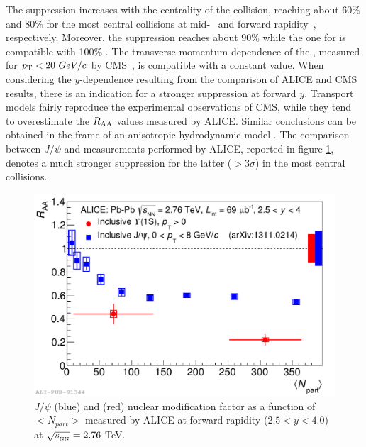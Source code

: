 The suppression increases with the centrality of the collision, reaching about 60\% and 80\% for the most central collisions at mid-~\cite{Khachatryan:2016xxp} and forward rapidity~\cite{Abelev:2014nua}, respectively. 
Moreover, the \upsiss suppression reaches about 90\% while the one for \upsisss is compatible with 100\% \cite{Khachatryan:2016xxp}. 
The transverse momentum dependence of the \upsis \raa, measured for $p_{\rm T}<20\ GeV/c$ by CMS~\cite{Khachatryan:2016xxp}, is compatible with a constant value. 
When considering the $y$-dependence resulting from the comparison of ALICE and CMS results, there is an indication for a stronger suppression at forward $y$.
Transport models \cite{Zhou:2014kka,Du:2017qkv} fairly reproduce the experimental observations of CMS, while they tend to overestimate the $R_{\rm AA}$ values measured by ALICE. 
Similar conclusions can be obtained in the frame of an anisotropic hydrodynamic model \cite{Krouppa:2017jlg}. 
The comparison between $J/\psi$ and \upsis measurements performed by ALICE, reported in figure \ref{fig:ALICE_jpsi_upsi}, denotes a much stronger suppression for the latter ($>3\sigma$) in the most central collisions.

\begin{figure}[!t]
\begin{center}
\includegraphics[width=0.8\linewidth]{Chapters/Analysis/Figs/2014-Dec-16-Raa_Jpsi_centr.pdf}
\caption{$J/\psi$ (blue) and \upsis (red) nuclear modification factor as a function of $<N_{part}>$ measured by ALICE at forward rapidity ($2.5<y<4.0$) at $\sqrt{s_{_{\rm NN}}}=2.76$ \rm{TeV}.}
\label{fig:ALICE_jpsi_upsi}
\end{center}
\end{figure}


